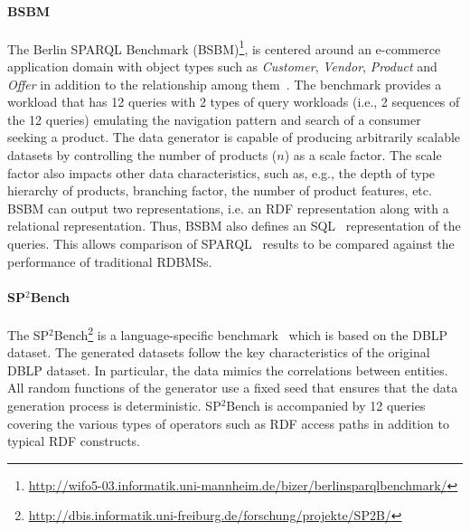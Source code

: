 \paragraph{BSBM} The Berlin SPARQL Benchmark (BSBM)\footnote{\url{http://wifo5-03.informatik.uni-mannheim.de/bizer/berlinsparqlbenchmark/}}, is centered around an e-commerce application domain with object types such as \emph{Customer}, \emph{Vendor}, \emph{Product} and \emph{Offer} in addition to the relationship among them~\cite{Bizer09theberlin}.
The benchmark provides a workload that has 12 queries with 2 types of query workloads (i.e., 2 sequences of the 12 queries) emulating the navigation pattern and search of a consumer seeking a product. The data generator is capable of producing arbitrarily scalable datasets by controlling the number of products ($n$) as a scale factor.  The scale factor also impacts other data characteristics, such as, e.g., the depth of type hierarchy of products, branching factor, the number of product features,  etc. BSBM can output two representations, i.e. an RDF representation along with a relational representation. Thus, BSBM also defines an SQL~\cite{sql} representation of the queries. This allows comparison of SPARQL~\cite{sparql} results  to be compared against the performance of traditional RDBMSs.


\paragraph{SP$^2$Bench} The SP$^2$Bench\footnote{\url{http://dbis.informatik.uni-freiburg.de/forschung/projekte/SP2B/}} is a language-specific benchmark~\cite{Schmidt2010} which is based on the DBLP dataset. %
The generated datasets follow the key characteristics of the original DBLP dataset. In particular, the data mimics the correlations between entities. All random functions of the generator use a fixed seed that ensures that the data generation process is deterministic. SP$^2$Bench is accompanied by 12 queries covering the various types of operators such as RDF access paths in addition to typical RDF constructs.





